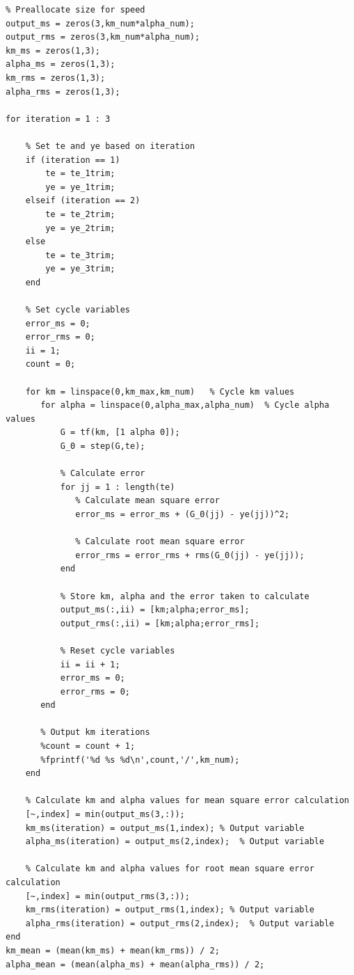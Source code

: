 \documentclass[11pt,a4paper]{article}
\begin{document}
\begin{enumerate}
    \begin{lstlisting}
% Preallocate size for speed
output_ms = zeros(3,km_num*alpha_num);
output_rms = zeros(3,km_num*alpha_num);
km_ms = zeros(1,3);
alpha_ms = zeros(1,3);
km_rms = zeros(1,3);
alpha_rms = zeros(1,3);
        
for iteration = 1 : 3
    
    % Set te and ye based on iteration
    if (iteration == 1)        
        te = te_1trim;
        ye = ye_1trim;
    elseif (iteration == 2)
        te = te_2trim;
        ye = ye_2trim;
    else
        te = te_3trim;
        ye = ye_3trim;
    end      
    
    % Set cycle variables
    error_ms = 0;
    error_rms = 0;
    ii = 1;
    count = 0;
    
    for km = linspace(0,km_max,km_num)   % Cycle km values
       for alpha = linspace(0,alpha_max,alpha_num)  % Cycle alpha values
           G = tf(km, [1 alpha 0]);
           G_0 = step(G,te);

           % Calculate error
           for jj = 1 : length(te)
              % Calculate mean square error
              error_ms = error_ms + (G_0(jj) - ye(jj))^2;
              
              % Calculate root mean square error
              error_rms = error_rms + rms(G_0(jj) - ye(jj));
           end
           
           % Store km, alpha and the error taken to calculate
           output_ms(:,ii) = [km;alpha;error_ms];
           output_rms(:,ii) = [km;alpha;error_rms];
           
           % Reset cycle variables
           ii = ii + 1;
           error_ms = 0;
           error_rms = 0;
       end
       
       % Output km iterations
       %count = count + 1;       
       %fprintf('%d %s %d\n',count,'/',km_num);
    end

    % Calculate km and alpha values for mean square error calculation
    [~,index] = min(output_ms(3,:));
    km_ms(iteration) = output_ms(1,index); % Output variable
    alpha_ms(iteration) = output_ms(2,index);  % Output variable

    % Calculate km and alpha values for root mean square error calculation
    [~,index] = min(output_rms(3,:));
    km_rms(iteration) = output_rms(1,index); % Output variable
    alpha_rms(iteration) = output_rms(2,index);  % Output variable    
end
km_mean = (mean(km_ms) + mean(km_rms)) / 2;
alpha_mean = (mean(alpha_ms) + mean(alpha_rms)) / 2;
    \end{lstlisting}
    

\end{enumerate}
\end{document}
